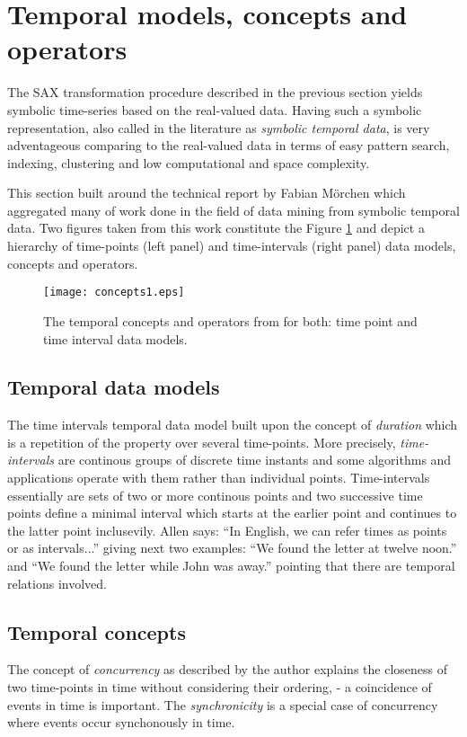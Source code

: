 \section{Temporal models, concepts and operators} \label{tconcepts}
The SAX transformation procedure described in the previous section yields symbolic time-series based on the real-valued data. Having such a symbolic representation, also called in the literature as \textit{symbolic temporal data}, is very adventageous comparing to the real-valued data in terms of easy pattern search, indexing, clustering and low computational and space complexity. 

This section built around the technical report by Fabian M\"orchen \cite{citeulike:1748833} which aggregated many of work done in the field of data mining from symbolic temporal data. Two figures taken from this work constitute the Figure \ref{fig:concepts1} and depict a hierarchy of time-points (left panel) and time-intervals (right panel) data models, concepts and operators.

\begin{figure}[tbp]
   \centering
   \texttt{[image: concepts1.eps]}
   \caption{The temporal concepts and operators from \cite{citeulike:1748833} for both: time point and time interval data models.}
   \label{fig:concepts1}
\end{figure}

\subsection{Temporal data models} \label{tconcepts_models}
The time intervals temporal data model built upon the concept of \textit{duration} which is a repetition of the property over several time-points. More precisely, \textit{time-intervals} are continous groups of discrete time instants and some algorithms and applications operate with them rather than individual points. Time-intervals essentially are sets of two or more continous points and two successive time points define a minimal interval which starts at the earlier point and continues to the latter point inclusevily. Allen \cite{citeulike:191348} says: ``In English, we can refer times as points or as intervals...'' giving next two examples: ``We found the letter at twelve noon.'' and ``We found the letter while John was away.'' pointing that there are temporal relations involved.

\subsection{Temporal concepts} \label{tconcepts_concepts}
The concept of \textit{concurrency} as described by the author explains the closeness of two time-points in time without considering their ordering, - a coincidence of events in time is important. The \textit{synchronicity} is a special case of concurrency where events occur synchonously in time.


